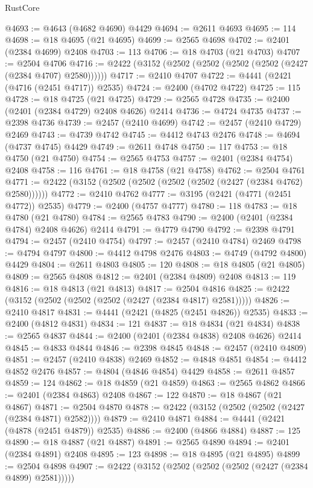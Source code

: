 \begin{lexlean}{RustCore}
\begin{coremodule}
@4693 := @4643 (@4682 @4690) @4429
@4694 := @2611 @4693
@4695 := 114
@4698 := @18 @4695 (@21 @4695)
@4699 := @2565 @4698
@4702 := @2401 (@2384 @4699) @2408
@4703 := 113
@4706 := @18 @4703 (@21 @4703)
@4707 := @2504 @4706
@4716 := @2422 (@3152 (@2502 (@2502 (@2502 (@2502 (@2427 (@2384 @4707) @2580))))))
@4717 := @2410 @4707
@4722 := @4441 (@2421 (@4716 (@2451 @4717)) @2535)
@4724 := @2400 (@4702 @4722)
@4725 := 115
@4728 := @18 @4725 (@21 @4725)
@4729 := @2565 @4728
@4735 := @2400 (@2401 (@2384 @4729) @2408 @4626) @2414
@4736 := @4724 @4735
@4737 := @2398 @4736
@4739 := @2457 (@2410 @4699)
@4742 := @2457 (@2410 @4729) @2469
@4743 := @4739 @4742
@4745 := @4412 @4743 @2476
@4748 := @4694 (@4737 @4745) @4429
@4749 := @2611 @4748
@4750 := 117
@4753 := @18 @4750 (@21 @4750)
@4754 := @2565 @4753
@4757 := @2401 (@2384 @4754) @2408
@4758 := 116
@4761 := @18 @4758 (@21 @4758)
@4762 := @2504 @4761
@4771 := @2422 (@3152 (@2502 (@2502 (@2502 (@2502 (@2427 (@2384 @4762) @2580))))))
@4772 := @2410 @4762
@4777 := @3195 (@2421 (@4771 (@2451 @4772)) @2535)
@4779 := @2400 (@4757 @4777)
@4780 := 118
@4783 := @18 @4780 (@21 @4780)
@4784 := @2565 @4783
@4790 := @2400 (@2401 (@2384 @4784) @2408 @4626) @2414
@4791 := @4779 @4790
@4792 := @2398 @4791
@4794 := @2457 (@2410 @4754)
@4797 := @2457 (@2410 @4784) @2469
@4798 := @4794 @4797
@4800 := @4412 @4798 @2476
@4803 := @4749 (@4792 @4800) @4429
@4804 := @2611 @4803
@4805 := 120
@4808 := @18 @4805 (@21 @4805)
@4809 := @2565 @4808
@4812 := @2401 (@2384 @4809) @2408
@4813 := 119
@4816 := @18 @4813 (@21 @4813)
@4817 := @2504 @4816
@4825 := @2422 (@3152 (@2502 (@2502 (@2502 (@2427 (@2384 @4817) @2581)))))
@4826 := @2410 @4817
@4831 := @4441 (@2421 (@4825 (@2451 @4826)) @2535)
@4833 := @2400 (@4812 @4831)
@4834 := 121
@4837 := @18 @4834 (@21 @4834)
@4838 := @2565 @4837
@4844 := @2400 (@2401 (@2384 @4838) @2408 @4626) @2414
@4845 := @4833 @4844
@4846 := @2398 @4845
@4848 := @2457 (@2410 @4809)
@4851 := @2457 (@2410 @4838) @2469
@4852 := @4848 @4851
@4854 := @4412 @4852 @2476
@4857 := @4804 (@4846 @4854) @4429
@4858 := @2611 @4857
@4859 := 124
@4862 := @18 @4859 (@21 @4859)
@4863 := @2565 @4862
@4866 := @2401 (@2384 @4863) @2408
@4867 := 122
@4870 := @18 @4867 (@21 @4867)
@4871 := @2504 @4870
@4878 := @2422 (@3152 (@2502 (@2502 (@2427 (@2384 @4871) @2582))))
@4879 := @2410 @4871
@4884 := @4441 (@2421 (@4878 (@2451 @4879)) @2535)
@4886 := @2400 (@4866 @4884)
@4887 := 125
@4890 := @18 @4887 (@21 @4887)
@4891 := @2565 @4890
@4894 := @2401 (@2384 @4891) @2408
@4895 := 123
@4898 := @18 @4895 (@21 @4895)
@4899 := @2504 @4898
@4907 := @2422 (@3152 (@2502 (@2502 (@2502 (@2427 (@2384 @4899) @2581)))))

\end{coremodule}
\end{lexlean}
